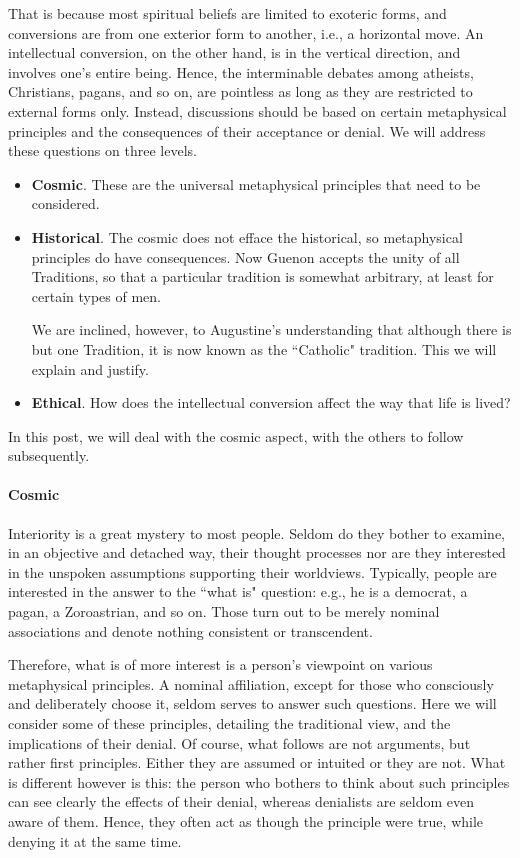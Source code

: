 That is because most spiritual beliefs are limited to exoteric forms, and conversions are from one exterior form to another, i.e., a horizontal move. An intellectual conversion, on the other hand, is in the vertical direction, and involves one's entire being. Hence, the interminable debates among atheists, Christians, pagans, and so on, are pointless as long as they are restricted to external forms only. Instead, discussions should be based on certain metaphysical principles and the consequences of their acceptance or denial. We will address these questions on three levels.

\begin{itemize}
\item \textbf{Cosmic}. These are the universal metaphysical principles that need to be considered. 
\item \textbf{Historical}. The cosmic does not efface the historical, so metaphysical principles do have consequences. Now Guenon accepts the unity of all Traditions, so that a particular tradition is somewhat arbitrary, at least for certain types of men.

We are inclined, however, to Augustine's understanding that although there is but one Tradition, it is now known as the ``Catholic" tradition. This we will explain and justify. 
\item \textbf{Ethical}. How does the intellectual conversion affect the way that life is lived? 
\end{itemize}
In this post, we will deal with the cosmic aspect, with the others to follow subsequently.

\paragraph{Cosmic}
Interiority is a great mystery to most people. Seldom do they bother to examine, in an objective and detached way, their thought processes nor are they interested in the unspoken assumptions supporting their worldviews. Typically, people are interested in the answer to the ``what is" question: e.g., he is a democrat, a pagan, a Zoroastrian, and so on. Those turn out to be merely nominal associations and denote nothing consistent or transcendent.

Therefore, what is of more interest is a person's viewpoint on various metaphysical principles. A nominal affiliation, except for those who consciously and deliberately choose it, seldom serves to answer such questions. Here we will consider some of these principles, detailing the traditional view, and the implications of their denial. Of course, what follows are not arguments, but rather first principles. Either they are assumed or intuited or they are not. What is different however is this: the person who bothers to think about such principles can see clearly the effects of their denial, whereas denialists are seldom even aware of them. Hence, they often act as though the principle were true, while denying it at the same time.

